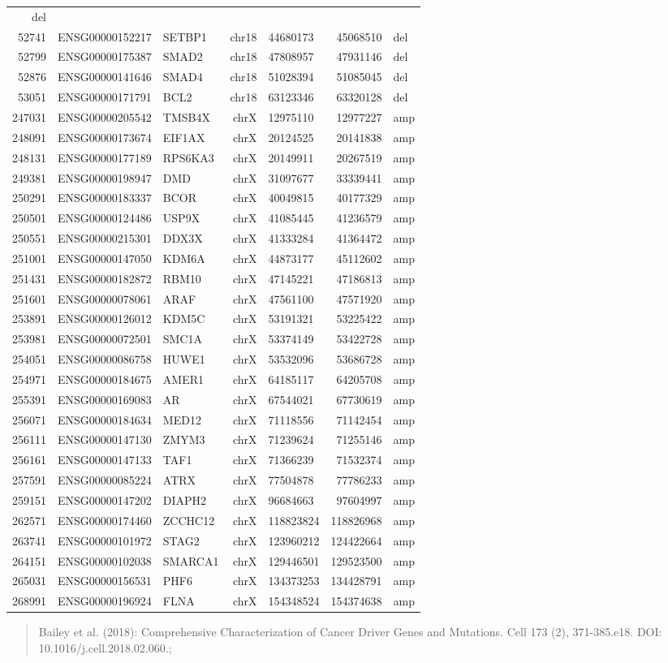 \documentclass[]{article}
\begin{document}
\begin{longtable}[]{@{}rrlrlrl@{}}
del\tabularnewline
52741 & ENSG00000152217 & SETBP1 & chr18 & 44680173 & 45068510 &
del\tabularnewline
52799 & ENSG00000175387 & SMAD2 & chr18 & 47808957 & 47931146 &
del\tabularnewline
52876 & ENSG00000141646 & SMAD4 & chr18 & 51028394 & 51085045 &
del\tabularnewline
53051 & ENSG00000171791 & BCL2 & chr18 & 63123346 & 63320128 &
del\tabularnewline
247031 & ENSG00000205542 & TMSB4X & chrX & 12975110 & 12977227 &
amp\tabularnewline
248091 & ENSG00000173674 & EIF1AX & chrX & 20124525 & 20141838 &
amp\tabularnewline
248131 & ENSG00000177189 & RPS6KA3 & chrX & 20149911 & 20267519 &
amp\tabularnewline
249381 & ENSG00000198947 & DMD & chrX & 31097677 & 33339441 &
amp\tabularnewline
250291 & ENSG00000183337 & BCOR & chrX & 40049815 & 40177329 &
amp\tabularnewline
250501 & ENSG00000124486 & USP9X & chrX & 41085445 & 41236579 &
amp\tabularnewline
250551 & ENSG00000215301 & DDX3X & chrX & 41333284 & 41364472 &
amp\tabularnewline
251001 & ENSG00000147050 & KDM6A & chrX & 44873177 & 45112602 &
amp\tabularnewline
251431 & ENSG00000182872 & RBM10 & chrX & 47145221 & 47186813 &
amp\tabularnewline
251601 & ENSG00000078061 & ARAF & chrX & 47561100 & 47571920 &
amp\tabularnewline
253891 & ENSG00000126012 & KDM5C & chrX & 53191321 & 53225422 &
amp\tabularnewline
253981 & ENSG00000072501 & SMC1A & chrX & 53374149 & 53422728 &
amp\tabularnewline
254051 & ENSG00000086758 & HUWE1 & chrX & 53532096 & 53686728 &
amp\tabularnewline
254971 & ENSG00000184675 & AMER1 & chrX & 64185117 & 64205708 &
amp\tabularnewline
255391 & ENSG00000169083 & AR & chrX & 67544021 & 67730619 &
amp\tabularnewline
256071 & ENSG00000184634 & MED12 & chrX & 71118556 & 71142454 &
amp\tabularnewline
256111 & ENSG00000147130 & ZMYM3 & chrX & 71239624 & 71255146 &
amp\tabularnewline
256161 & ENSG00000147133 & TAF1 & chrX & 71366239 & 71532374 &
amp\tabularnewline
257591 & ENSG00000085224 & ATRX & chrX & 77504878 & 77786233 &
amp\tabularnewline
259151 & ENSG00000147202 & DIAPH2 & chrX & 96684663 & 97604997 &
amp\tabularnewline
262571 & ENSG00000174460 & ZCCHC12 & chrX & 118823824 & 118826968 &
amp\tabularnewline
263741 & ENSG00000101972 & STAG2 & chrX & 123960212 & 124422664 &
amp\tabularnewline
264151 & ENSG00000102038 & SMARCA1 & chrX & 129446501 & 129523500 &
amp\tabularnewline
265031 & ENSG00000156531 & PHF6 & chrX & 134373253 & 134428791 &
amp\tabularnewline
268991 & ENSG00000196924 & FLNA & chrX & 154348524 & 154374638 &
amp\tabularnewline
\bottomrule
\end{longtable}

\begin{quote}
Bailey et al. (2018): Comprehensive Characterization of Cancer Driver
Genes and Mutations. Cell 173 (2), 371-385.e18. DOI:
10.1016/j.cell.2018.02.060.;
\end{quote}
\end{document}
